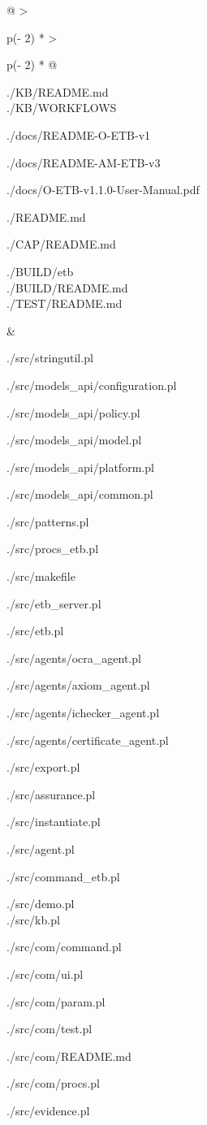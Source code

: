 \documentclass[12pt,twoside,a4paper]{article}
\begin{document}
\begin{longtable}[]{@{}
  >{\raggedright\arraybackslash}p{(\columnwidth - 2\tabcolsep) * }
  >{\raggedright\arraybackslash}p{(\columnwidth - 2\tabcolsep) * }@{}}
\begin{minipage}[b]{\linewidth}
./KB/README.md\\
./KB/WORKFLOWS

./docs/README-O-ETB-v1

./docs/README-AM-ETB-v3

./docs/O-ETB-v1.1.0-User-Manual.pdf

./README.md

./CAP/README.md

./BUILD/etb\\
./BUILD/README.md\\
./TEST/README.md\strut
\end{minipage} & \begin{minipage}[b]{\linewidth}\raggedright
./src/stringutil.pl

./src/models\_api/configuration.pl

./src/models\_api/policy.pl

./src/models\_api/model.pl

./src/models\_api/platform.pl

./src/models\_api/common.pl

./src/patterns.pl

./src/procs\_etb.pl

./src/makefile

./src/etb\_server.pl

./src/etb.pl

./src/agents/ocra\_agent.pl

./src/agents/axiom\_agent.pl

./src/agents/ichecker\_agent.pl

./src/agents/certificate\_agent.pl

./src/export.pl

./src/assurance.pl

./src/instantiate.pl

./src/agent.pl

./src/command\_etb.pl

./src/demo.pl\\
./src/kb.pl

./src/com/command.pl

./src/com/ui.pl

./src/com/param.pl

./src/com/test.pl

./src/com/README.md

./src/com/procs.pl

./src/evidence.pl\strut
\end{minipage} \\
\midrule
\endhead
\bottomrule
\end{longtable}
\end{document}
